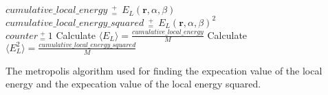 \begin{algorithm}[h!]
{{{                $\textit{cumulative\_local\_energy}~~ ^+_= ~~E_L(\mathbf{r}, \alpha, \beta)$ 
                $\textit{cumulative\_local\_energy\_squared}~~ ^+_= ~~E_L(\mathbf{r}, \alpha, \beta)^2$ \\ 
                $\textit{counter}~ ^+_= ~1$  
        }       
 }
Calculate $\langle E_L \rangle = \frac{\textit{cumulative\_local\_energy}}{M}$ \;
Calculate $\langle E_L^2 \rangle = \frac{\textit{cumulative\_local\_energy\_squared}}{M}$ \;
}
\caption{The metropolis algorithm used for finding the expecation value of the
local energy and the expecation value of the local energy squared.}
\label{alg:metropolis}
\end{algorithm}